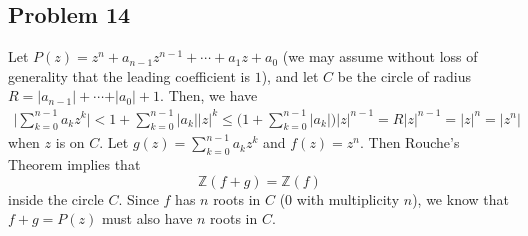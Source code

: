 \documentclass[12pt]{article}
\newcommand{\zz}{\mathbb Z}
\begin{document}
\subsection*{Problem 14}
Let $P(z) = z^n + a_{n-1} z^{n-1} + \cdots + a_1 z + a_0$ (we may assume without loss of generality that the leading coefficient is $1$), and let $C$ be the circle of radius $R =  \vert a_{n-1} \vert + \cdots +  \vert a_0\vert + 1$. Then, we have
\begin{align*}
\bigg \vert \sum_{k=0}^{n-1} a_k z^k \bigg \vert < 1 + \sum_{k=0}^{n-1} \vert a_k \vert \vert z \vert^k \leq \bigg(1+\sum_{k=0}^{n-1} \vert a_k \vert\bigg) \vert z \vert^{n-1}
 = R \vert z \vert^{n-1} = \vert z \vert^n = \vert z^n \vert
\end{align*} when $z$ is on $C$. Let $g(z) = \sum_{k=0}^{n-1} a_k z^k$ and $f(z) = z^n$. Then Rouche's Theorem implies that
\[
\zz(f+g) = \zz(f)
\] inside the circle $C$. Since $f$ has $n$ roots in $C$ ($0$ with multiplicity $n$), we know that $f+g = P(z)$ must also have $n$ roots in $C$.
\end{document}
